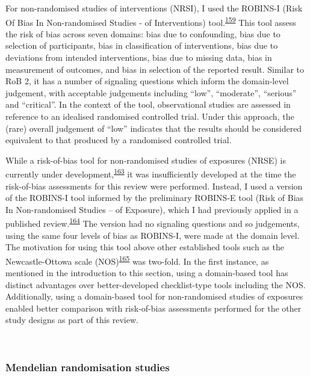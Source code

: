 \documentclass[a4paper, twoside]{templates/ociamthesis}
\begin{document}
For non-randomised studies of interventions (NRSI), I used the ROBINS-I (Risk Of Bias In Non-randomised Studies - of Interventions) tool.\textsuperscript{\protect\hyperlink{ref-sterne2016}{159}} This tool assess the risk of bias across seven domains: bias due to confounding, bias due to selection of participants, bias in classification of interventions, bias due to deviations from intended interventions, bias due to missing data, bias in measurement of outcomes, and bias in selection of the reported result. Similar to RoB 2, it has a number of signaling questions which inform the domain-level judgement, with acceptable judgements including ``low'', ``moderate'', ``serious'' and ``critical''. In the context of the tool, observational studies are assessed in reference to an idealised randomised controlled trial. Under this approach, the (rare) overall judgement of ``low'' indicates that the results should be considered equivalent to that produced by a randomised controlled trial.

While a risk-of-bias tool for non-randomised studies of exposures (NRSE) is currently under development,\textsuperscript{\protect\hyperlink{ref-morganr2020}{163}} it was insufficiently developed at the time the risk-of-bias assessments for this review were performed. Instead, I used a version of the ROBINS-I tool informed by the preliminary ROBINS-E tool (Risk of Bias In Non-randomised Studies -- of Exposure), which I had previously applied in a published review.\textsuperscript{\protect\hyperlink{ref-french2019}{164}} The version had no signaling questions and so judgements, using the same four levels of bias as ROBINS-I, were made at the domain level. The motivation for using this tool above other established tools such as the Newcastle-Ottowa scale (NOS)\textsuperscript{\protect\hyperlink{ref-wells2000}{165}} was two-fold. In the first instance, as mentioned in the introduction to this section, using a domain-based tool has distinct advantages over better-developed checklist-type tools including the NOS. Additionally, using a domain-based tool for non-randomised studies of exposures enabled better comparison with risk-of-bias assessments performed for the other study designs as part of this review.

~

\hypertarget{mendelian-randomisation-studies}{%
\subsubsection{Mendelian randomisation studies}\label{mendelian-randomisation-studies}}
\end{document}
